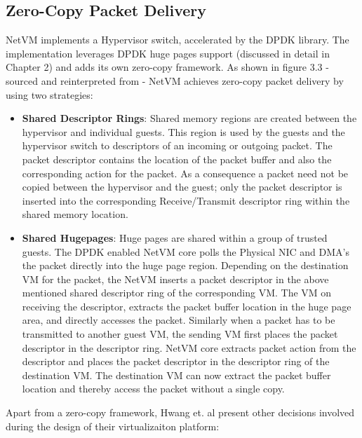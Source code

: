 \subsection*{Zero-Copy Packet Delivery}
NetVM implements a Hypervisor switch, accelerated by the DPDK library. The implementation leverages DPDK huge pages support (discussed in detail in Chapter 2) and adds its own zero-copy framework. As shown in figure 3.3 - sourced and reinterpreted from\cite{hwang2015netvm} - NetVM achieves zero-copy packet delivery by using two strategies: 
\begin{itemize}

\item \textbf{Shared Descriptor Rings}: Shared memory regions are created between the hypervisor and individual guests. This region is used by the guests and the hypervisor switch to  descriptors of an incoming or outgoing packet. The packet descriptor contains the location of the packet buffer and also the corresponding action for the packet. As a consequence a packet need not be copied between the hypervisor and the guest; only the packet descriptor is inserted into the corresponding Receive/Transmit descriptor ring within the shared memory location.

\item \textbf{Shared Hugepages}: Huge pages are shared within a group of trusted guests. The DPDK enabled NetVM core polls the Physical NIC and DMA's the packet directly into the huge page region. Depending on the destination VM for the packet, the NetVM inserts a packet descriptor in the above mentioned shared descriptor ring of the corresponding VM. The VM on receiving the descriptor, extracts the packet buffer location in the huge page area, and directly accesses the packet. Similarly when a packet has to be transmitted to another guest VM, the sending VM first places the packet descriptor in the descriptor ring. NetVM core extracts packet action from the descriptor and places the packet descriptor in the descriptor ring of the destination VM. The destination VM can now extract the packet buffer location and thereby access the packet without a single copy.
\end{itemize}

Apart from a zero-copy framework, Hwang et. al present other decisions involved during the design of their virtualizaiton platform:


